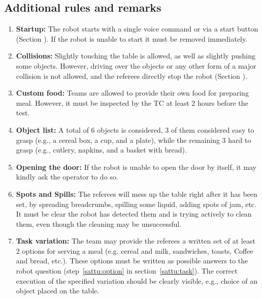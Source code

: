 \subsection{Additional rules and remarks}
\label{sattu:add}
\begin{enumerate}
	\item \textbf{Startup:} The robot starts with a single voice command or via a start button (Section ). If the robot is unable to start it must be removed immediately.

	\item \textbf{Collisions:} Slightly touching the table is allowed, as well as slightly pushing some objects. However, driving over the objects or any other form of a major collision is not allowed, and the referees directly stop the robot (Section ).

	\item \textbf{Custom food:} Teams are allowed to provide their own food for preparing meal. However, it must be inspected by the TC at least 2 hours before the test.

	\item \textbf{Object list:} A total of 6 objects is considered, 3 of them considered easy to grasp (e.g., a cereal box, a cup, and a plate), while the remaining 3 hard to grasp (e.g., cutlery, napkins, and a basket with bread).

	\item \textbf{Opening the door:} If the robot is unable to open the door by itself, it may kindly ask the operator to do so.

	\item \textbf{Spots and Spills:} The referees will mess up the table right after it has been set, by spreading breadcrumbs, spilling some liquid, adding spots of jam, etc. It must be clear the robot has detected them and is trying actively to clean them, even though the cleaning may be unsuccessful.

	\item \textbf{Task variation:} The team may provide the referees a written set of at least 2 options for serving a meal (e.g. cereal and milk, sandwiches, toasts, Coffee and bread, etc.). These options must be written as possible answers to the robot question (step~\ref{sattu:option} in section~\ref{sattu:task}). The correct execution of the specified variation should be clearly visible, e.g., choice of an object placed on the table.
\end{enumerate}

